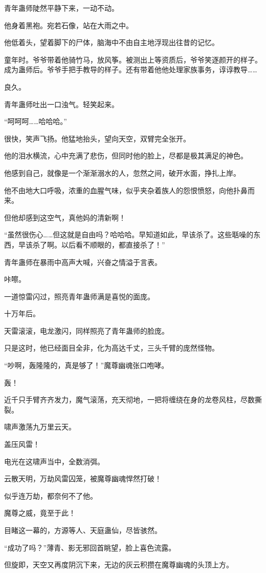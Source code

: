\begin{this_body}
青年蛊师陡然平静下来，一动不动。

他身着黑袍。宛若石像，站在大雨之中。

他低着头，望着脚下的尸体，脑海中不由自主地浮现出往昔的记忆。

童年时。爷爷带着他骑竹马，放风筝。被测出上等资质后，爷爷笑逐颜开的样子。成为蛊师后。爷爷手把手教导的样子。还有带着他他处理家族事务，谆谆教导……

良久。

青年蛊师吐出一口浊气。轻笑起来。

“呵呵呵……哈哈哈。”

很快，笑声飞扬。他猛地抬头，望向天空，双臂完全张开。

他的泪水横流，心中充满了悲伤，但同时他的脸上，尽都是极其满足的神色。

他感到自己，就像是一个渐渐溺水的人，忽然之间，破开水面，挣扎上岸。

他不由地大口呼吸，浓重的血腥气味，似乎夹杂着族人的怨恨愤怒，向他扑鼻而来。

但他却感到这空气，真他妈的清新啊！

“虽然很伤心……但这就是自由吗？哈哈哈。早知道如此，早该杀了。这些聒噪的东西，早该杀了啊。以后看不顺眼的，都直接杀了！”

青年蛊师在暴雨中高声大喊，兴奋之情溢于言表。

咔嚓。

一道惊雷闪过，照亮青年蛊师满是喜悦的面庞。

十万年后。

天雷滚滚，电龙激闪，同样照亮了青年蛊师的脸庞。

只是这时，他已经面目全非，化为高达千丈，三头千臂的庞然怪物。

“吵啊，轰隆隆的，真是够了！”魔尊幽魂张口咆哮。

轰！

近千只手臂齐齐发力，魔气滚荡，充天彻地，一把将缠绕在身的龙卷风柱，尽数撕裂。

啸声激荡九万里云天。

盖压风雷！

电光在这啸声当中，全数消弭。

云散天明，万劫风雷囚笼，被魔尊幽魂悍然打破！

似乎连万劫，都奈何不了他。

魔尊之威，竟至于此！

目睹这一幕的，方源等人、天庭蛊仙，尽皆骇然。

“成功了吗？”薄青、影无邪回首眺望，脸上喜色流露。

但旋即，天空又再度阴沉下来，无边的灰云积攒在魔尊幽魂的头顶上方。


\end{this_body}
